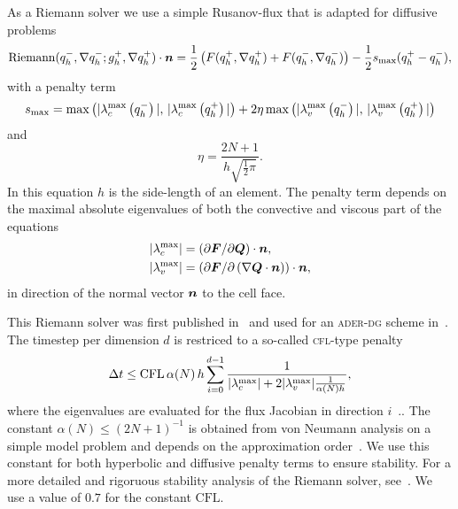 As a Riemann solver we use a simple Rusanov-flux that is adapted for diffusive problems
\begin{equation}
  \label{eq:rusanov-flux}
  \operatorname{Riemann}(q_h^-, \nabla q_h^-; g_h^+, \nabla q_h^+) \cdot \bm{n} =
  \frac{1}{2} \left(
    F(q_h^+, \nabla q_h^+) +
    F(q_h^-, \nabla q_h^-)
  \right) -
  \frac{1}{2} s_\text{max} (q_h^+ - q_h^-),
\end{equation}
with a penalty term
\begin{equation}
  \label{eq:parabolic-penalty}
  s_\text{max}  = \max \left(
\maxConvEigen[q_h^-], \, \maxConvEigen[q_h^+]
\right) +
2 \eta \max \left(
\maxViscEigen[q_h^-], \, \maxViscEigen[q_h^+]
\right)
\end{equation}
and
\begin{equation}
  \eta = \frac{2N+1}{h \sqrt{\frac{1}{2} \pi}}.
\end{equation}
In this equation $h$ is the side-length of an element.
The penalty term depends on the maximal absolute eigenvalues of both the convective and viscous part of the equations
\begin{align}
  \begin{split}
    \maxConvEigen &= \left( \partial \bm{F}/\partial \bm{Q}\right) \cdot \normal,\\
    \maxViscEigen &= \left( \partial \bm{F}/\partial \left( \nabla \bm{Q} \cdot \normal \right)\right) \cdot \normal,
  \end{split}
\end{align}
in direction of the normal vector $\bm{n}$ to the cell face. 

This Riemann solver was first published in~\cite{gassner2008discontinuous} and used for an \textsc{ader-dg} scheme in~\cite{dumbser2010arbitrary}.
The timestep per dimension $d$ is restriced to a so-called \textsc{cfl}-type penalty
\begin{equation}\label{eq:cfl-aderdg}
 \Delta t \leq  \text{CFL} \, \alpha(N) \, h \sum_{i=0}^{\dimensions-1} \frac{1}{\maxConvEigen + 2 \maxViscEigen \frac{1}{\alpha(N) h}},
\end{equation}
where the eigenvalues are evaluated for the flux Jacobian in direction $i$~\cite{dumbser2010arbitrary,gassner2008discontinuous}..
The constant $\alpha(N) \leq {\left( 2N+1  \right)}^{-1}$ is obtained from von Neumann analysis on a simple model problem and depends on the approximation order~\cite{dumbser2008unified}.
We use this constant for both hyperbolic and diffusive penalty terms to ensure stability.
For a more detailed and rigoruous stability analysis of the Riemann solver, see~\cite{gassner2008discontinuous}.
We use a value of $0.7$ for the constant $\text{CFL}$.


